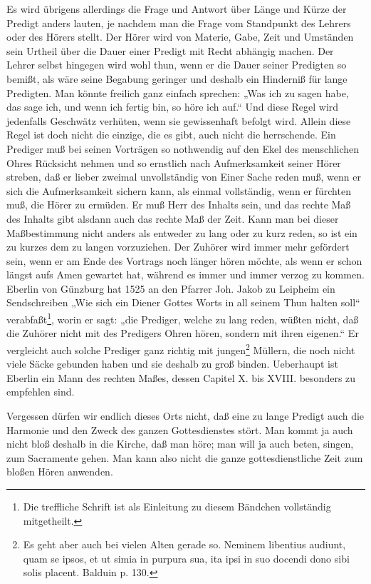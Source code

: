 Es wird übrigens allerdings die Frage und Antwort über Länge und Kürze der Predigt anders lauten, je nachdem man die Frage vom Standpunkt des Lehrers oder des Hörers stellt. Der Hörer wird von Materie, Gabe, Zeit und Umständen sein Urtheil über die Dauer einer Predigt mit Recht abhängig machen. Der Lehrer selbst hingegen wird wohl thun, wenn er die Dauer seiner Predigten so bemißt, als wäre seine Begabung geringer und deshalb ein Hinderniß für lange Predigten. Man könnte freilich ganz einfach sprechen: „Was ich zu sagen habe, das sage ich, und wenn ich fertig bin, so höre ich auf.“ Und diese Regel wird jedenfalls Geschwätz verhüten, wenn sie gewissenhaft befolgt wird. Allein diese Regel ist doch nicht die einzige, die es gibt, auch nicht die herrschende. Ein Prediger muß bei seinen Vorträgen so nothwendig auf den Ekel des menschlichen Ohres Rücksicht nehmen und so ernstlich nach Aufmerksamkeit seiner Hörer streben, daß er lieber zweimal unvollständig von Einer Sache reden muß, wenn er sich die Aufmerksamkeit sichern kann, als einmal vollständig,
wenn er fürchten muß, die Hörer zu ermüden. Er muß Herr des Inhalts sein, und das rechte Maß des Inhalts gibt alsdann auch das rechte Maß der Zeit. Kann man bei dieser Maßbestimmung nicht anders als entweder zu lang oder zu kurz reden, so ist ein zu kurzes dem zu langen vorzuziehen. Der Zuhörer wird immer mehr gefördert sein, wenn er am Ende des Vortrags noch länger hören möchte, als wenn er schon längst aufs Amen gewartet hat, während es immer und immer verzog zu kommen. Eberlin von Günzburg hat 1525 an den Pfarrer Joh. Jakob zu Leipheim ein Sendschreiben „Wie sich ein Diener Gottes Worts in all seinem Thun halten soll“ verabfaßt\footnote{Die treffliche Schrift ist als Einleitung zu diesem Bändchen vollständig mitgetheilt.}, worin er sagt: „die Prediger, welche zu lang reden, wüßten nicht, daß die Zuhörer nicht mit des Predigers Ohren hören, sondern mit ihren eigenen.“ Er vergleicht auch solche Prediger ganz richtig mit jungen\footnote{Es geht aber auch bei vielen Alten gerade so. Neminem libentius audiunt, quam se ipsos, et ut simia in purpura sua, ita ipsi in suo docendi dono sibi solis placent. Balduin p. 130.} Müllern, die noch nicht viele Säcke gebunden haben und sie deshalb zu groß binden. Ueberhaupt ist Eberlin ein Mann des rechten Maßes, dessen Capitel X. bis XVIII. besonders zu empfehlen sind.

Vergessen dürfen wir endlich dieses Orts nicht, daß eine zu lange Predigt auch die Harmonie und den Zweck des ganzen Gottesdienstes stört. Man kommt ja auch nicht
bloß deshalb in die Kirche, daß man höre; man will ja auch beten, singen, zum Sacramente gehen. Man kann also nicht die ganze gottesdienstliche Zeit zum bloßen Hören anwenden.


